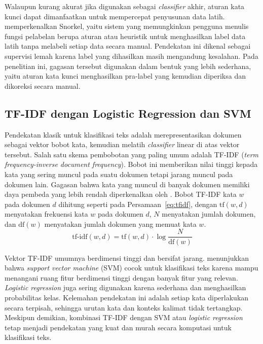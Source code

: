 Walaupun kurang akurat jika digunakan sebagai \emph{classifier} akhir, aturan kata kunci dapat dimanfaatkan untuk mempercepat penyusunan data latih. \textcite{ratner2017} memperkenalkan Snorkel, yaitu sistem yang memungkinkan pengguna menulis fungsi pelabelan berupa aturan atau heuristik untuk menghasilkan label data latih tanpa melabeli setiap data secara manual. Pendekatan ini dikenal sebagai supervisi lemah karena label yang dihasilkan masih mengandung kesalahan. Pada penelitian ini, gagasan tersebut digunakan dalam bentuk yang lebih sederhana, yaitu aturan kata kunci menghasilkan pra-label yang kemudian diperiksa dan dikoreksi secara manual.

\subsection{TF-IDF dengan Logistic Regression dan SVM}

Pendekatan klasik untuk klasifikasi teks adalah merepresentasikan dokumen sebagai vektor bobot kata, kemudian melatih \emph{classifier} linear di atas vektor tersebut. Salah satu skema pembobotan yang paling umum adalah TF-IDF (\emph{term frequency-inverse document frequency}). Bobot ini memberikan nilai tinggi kepada kata yang sering muncul pada suatu dokumen tetapi jarang muncul pada dokumen lain. Gagasan bahwa kata yang muncul di banyak dokumen memiliki daya pembeda yang lebih rendah diperkenalkan oleh \textcite{sparckjones1972}. Bobot TF-IDF kata $w$ pada dokumen $d$ dihitung seperti pada Persamaan~\ref{eq:tfidf}, dengan $\mathrm{tf}(w,d)$ menyatakan frekuensi kata $w$ pada dokumen $d$, $N$ menyatakan jumlah dokumen, dan $\mathrm{df}(w)$ menyatakan jumlah dokumen yang memuat kata $w$.
\begin{equation}
\text{tf-idf}(w,d) = \mathrm{tf}(w,d) \cdot \log \frac{N}{\mathrm{df}(w)}
\label{eq:tfidf}
\end{equation}

Vektor TF-IDF umumnya berdimensi tinggi dan bersifat jarang. \textcite{joachims1998} menunjukkan bahwa \emph{support vector machine} (SVM) cocok untuk klasifikasi teks karena mampu menangani ruang fitur berdimensi tinggi dengan banyak fitur yang relevan. \emph{Logistic regression} juga sering digunakan karena sederhana dan menghasilkan probabilitas kelas. Kelemahan pendekatan ini adalah setiap kata diperlakukan secara terpisah, sehingga urutan kata dan konteks kalimat tidak tertangkap. Meskipun demikian, kombinasi TF-IDF dengan SVM atau \emph{logistic regression} tetap menjadi pendekatan yang kuat dan murah secara komputasi untuk klasifikasi teks.

